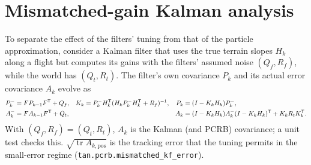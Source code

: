 \section{Mismatched-gain Kalman analysis}\label{app:mismatch}
To separate the effect of the filters' tuning from that of the particle approximation, consider a
Kalman filter that uses the true terrain slopes $H_k$ along a flight but computes its gains with
the filters' assumed noise $(Q_f, R_f)$, while the world has $(Q_t, R_t)$. The filter's own
covariance $P_k$ and its actual error covariance $A_k$ evolve as
\begin{align}
  P_k^- &= F P_{k-1} F^{\mathsf{T}} + Q_f, & K_k &= P_k^- H_k^{\mathsf{T}} (H_k P_k^- H_k^{\mathsf{T}} + R_f)^{-1},
  & P_k &= (I - K_k H_k) P_k^-,\\
  A_k^- &= F A_{k-1} F^{\mathsf{T}} + Q_t, &&& A_k &= (I - K_k H_k) A_k^- (I - K_k H_k)^{\mathsf{T}} + K_k R_t K_k^{\mathsf{T}} .
\end{align}
With $(Q_f, R_f) = (Q_t, R_t)$, $A_k$ is the Kalman (and PCRB) covariance; a unit test checks
this. $\sqrt{\operatorname{tr} A_{k,\mathrm{pos}}}$ is the tracking error that the tuning permits
in the small-error regime (\texttt{tan.pcrb.mismatched\_kf\_error}).

\begin{table}[H]
  \centering\scriptsize
  \caption{E5: consistency in the tracking window (ANEES over all and over converged runs, share
    of single-run NEES inside the $\chi^2_2$ 95\,\% interval) and RMSE relative to the ensemble
    PCRB (all runs: a valid comparison; converged runs: conditional).}\label{tab:e5cons}
  \resizebox{\textwidth}{!}{}
\end{table}

\begin{table}[H]
  \centering\scriptsize
  \caption{E5: per flight plan ($M = 100$, $\sigma_0 = 500$\,m): PCRB, tracking RMSE a Kalman
    filter with the PF's tuning would achieve, and the filters' tracking RMSE (converged
    runs).}\label{tab:e5plans}
  \resizebox{\textwidth}{!}{}
\end{table}

\begin{table}[H]
  \centering\small
  \caption{E6 development study (seed root 1000, $M = \ESixDevRuns$ per cell): convergence at
    $\sigma_0 = 2$\,km and false-alarm rate at 250\,m, pooled over the three regions.}\label{tab:e6dev}
  
\end{table}


